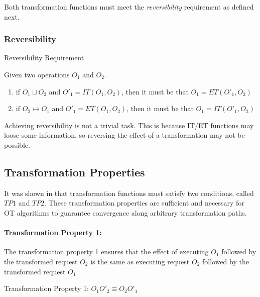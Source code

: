 \documentclass[11pt,a4paper]{article}
\begin{document}
Both transformation functions must meet the \emph{reversibility} requirement as defined next.

\subsubsection{Reversibility}
\begin{defn}
Reversibility Requirement
\end{defn}

Given two operations $O_{1}$ and $O_{2}$.

\begin{enumerate}
 \item if $O_{1} \sqcup O_{2}$ and $O'_{1} = IT(O_{1},O_{2})$, then it must
       be that $O_{1} = ET(O'_{1},O_{2})$
 \item if $O_{2} \mapsto O_{1}$ and $O'_{1} = ET(O_{1},O_{2})$, then it must
       be that $O_{1} = IT(O'_{1},O_{2})$
\end{enumerate}

Achieving reversibility is not a trivial task. This is because IT/ET functions may loose some information, so reversing the effect of a transformation may not be possible.


\subsection{Transformation Properties}
It was shown in \cite{ressel96} that transformation functions must satisfy two conditions, called $TP1$ and $TP2$. These transformation properties are sufficient and necessary for OT algorithms to guarantee convergence along arbitrary transformation paths.

\paragraph{Transformation Property 1:}
The transformation property 1 ensures that the effect of executing $O_{1}$ followed by the transformed request $O_{2}$ is the same as executing request $O_{2}$ followed by the transformed request $O_{1}$. 

\begin{defn}
Transformation Property 1:
$ O_{1} O'_{2} \equiv O_{2} O'_{1} $
\end{defn}
\end{document}
